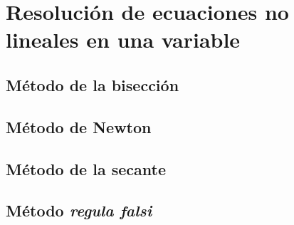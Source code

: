 \section{Resolución de ecuaciones no lineales en una variable}
\subsection{Método de la bisección}
\subsection{Método de Newton}
\subsection{Método de la secante}
\subsection{Método \emph{regula falsi}}

